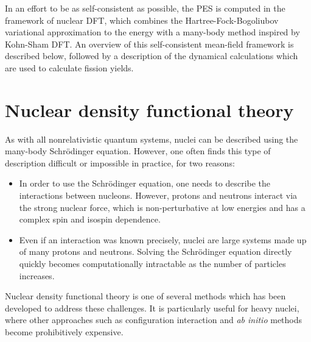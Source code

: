 
In an effort to be as self-consistent as possible, the PES is computed in the framework of nuclear DFT, which combines the Hartree-Fock-Bogoliubov variational approximation to the energy with a many-body method inspired by Kohn-Sham DFT. An overview of this self-consistent mean-field framework is described below, followed by a description of the dynamical calculations which are used to calculate fission yields.

\section{Nuclear density functional theory}
As with all nonrelativistic quantum systems, nuclei can be described using the many-body Schr\"{o}dinger equation. However, one often finds this type of description difficult or impossible in practice, for two reasons:

\begin{itemize}
\item In order to use the Schr\"{o}dinger equation, one needs to describe the interactions between nucleons. However, protons and neutrons interact via the strong nuclear force, which is non-perturbative at low energies and has a complex spin and isospin dependence.%
\item Even if an interaction was known precisely, nuclei are large systems made up of many protons and neutrons. Solving the Schr\"{o}dinger equation directly quickly becomes computationally intractable as the number of particles increases.
\end{itemize}

Nuclear density functional theory is one of several methods which has been developed to address these challenges. It is particularly useful for heavy nuclei, where other approaches such as configuration interaction and \textit{ab initio} methods become prohibitively expensive.

